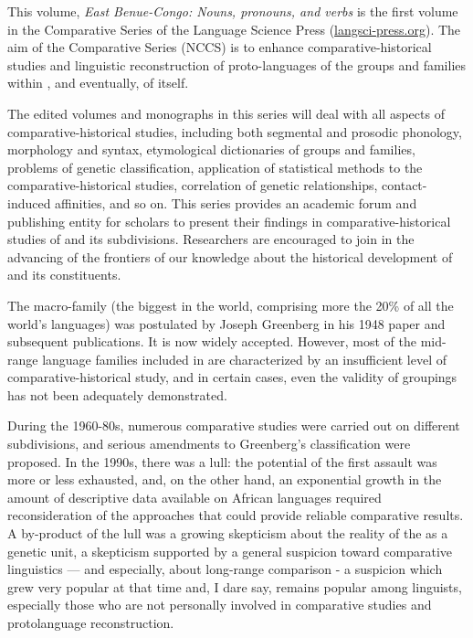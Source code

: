 This volume, \textit{East Benue-Congo: Nouns, pronouns, and verbs} is the first volume in the  Comparative Series of the Language Science Press (\url{langsci-press.org}). The aim of the  Comparative Series (NCCS) is to enhance comparative-historical studies and linguistic reconstruction of proto-languages of the groups and families within , and eventually, of  itself. 

The edited volumes and monographs in this series will deal with all aspects of comparative-historical  studies, including both segmental and prosodic phonology, morphology and syntax, etymological dictionaries of groups and families, problems of genetic classification, application of statistical methods to the comparative-historical  studies, correlation of genetic relationships, contact-induced affinities, and so on. This series provides an academic forum and publishing entity for scholars to present their findings in comparative-historical studies of  and its subdivisions. Researchers are encouraged to join in the advancing of the frontiers of our knowledge about the historical development of  and its constituents. 

The  macro-family (the biggest in the world, comprising more the 20\% of all the world’s languages) was postulated by Joseph Greenberg in his 1948 paper and subsequent publications. It is now widely accepted. However, most of the mid-range language families included in  are characterized by an insufficient level of comparative-historical study, and in certain cases, even the validity of groupings has not been adequately demonstrated.

During  {the } 1960-80s, numerous comparative studies were carried out on different  subdivisions, and serious amendments to Greenberg's classification were proposed. In  {the }  1990s, there was a lull: the potential of the first assault was more or less exhausted, and, on the other hand, an exponential growth in the amount of descriptive data available on African languages required reconsideration of the approaches that could provide reliable comparative results. A by-product of the lull was a growing skepticism about the reality of the  as a genetic unit, a skepticism supported by a general suspicion toward  comparative linguistics — and especially, about long-range comparison - a suspicion which grew very popular at that time and, I dare say, remains popular among linguists, especially those who are not personally involved in comparative studies and protolanguage reconstruction.

